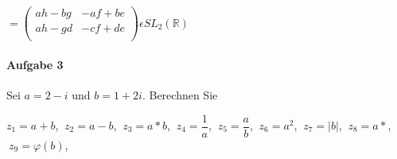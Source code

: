 \documentclass[paper=a4, fontsize=11pt]{scrartcl}
\numberwithin{equation}{section}
\numberwithin{figure}{section}
\numberwithin{table}{section}
\begin{document}
$ =
\begin{pmatrix}
ah-bg & -af+be  \\
ah-gd & -cf+de \\
\end{pmatrix} 
\epsilon SL_{2}(\mathbb{R})$


\paragraph{Aufgabe 3}

Sei $a=2-i$ und $b=1+2i$. Berechnen Sie

\begin{center}
$z_{1}=a+b$, $\: z_{2}=a-b$,  $\: z_{3}=a*b$,  $\: z_{4}= \dfrac{1}{a}$,  $\: z_{5}= \dfrac{a}{b}$,  $\: z_{6}=a^{2}$,  $\: z_{7}=|b|$,  $\: z_{8}=a*$,  $\: z_{9}= \varphi (b)$,
\end{center}
\end{document}
